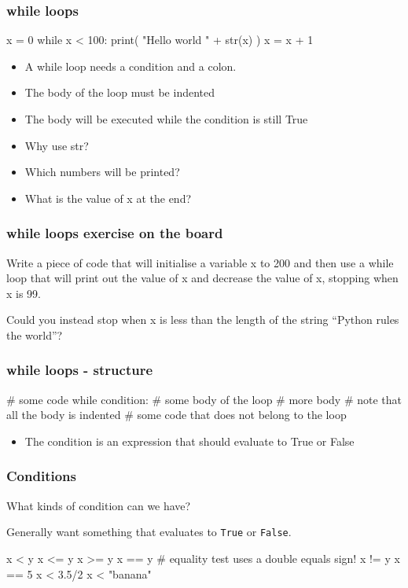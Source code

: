 \documentclass{beamer}
\begin{document}
\begin{frame}[fragile]
\frametitle{while loops}
\begin{code}
x = 0
while x < 100:
   print( "Hello world " + str(x) )
   x = x + 1
\end{code}
\begin{itemize}
\item A while loop needs a condition and a colon.
\item The body of the loop must be indented
\item The body will be executed while the condition is still True
\item Why use str?
\item Which numbers will be printed?
\item What is the value of x at the end?
\end{itemize}
\end{frame}

\begin{frame}[fragile]
\frametitle{while loops exercise on the board}
Write a piece of code that will initialise a variable x to 200
and then use a while loop that will print out the value of x
and decrease the value of x, stopping when x is 99.

\bigskip

Could you instead stop when x is less than the length of
the string “Python rules the world”?
\end{frame}


\begin{frame}[fragile]
\frametitle{while loops - structure}
\begin{code}
# some code
while condition:
   # some body of the loop
   # more body
   # note that all the body is indented
# some code that does not belong to the loop
\end{code}
\begin{itemize}
\item The condition is an expression that should evaluate to True or False
\end{itemize}
\end{frame}

\begin{frame}[fragile]
\frametitle{Conditions}
What kinds of condition can we have?

Generally want something that evaluates to {\tt True} or {\tt False}.

\begin{code}
x < y
x <= y
x >= y
x == y    # equality test uses a double equals sign!
x != y
x == 5
x < 3.5/2
x < "banana"
\end{code}
\end{frame}
\end{document}
